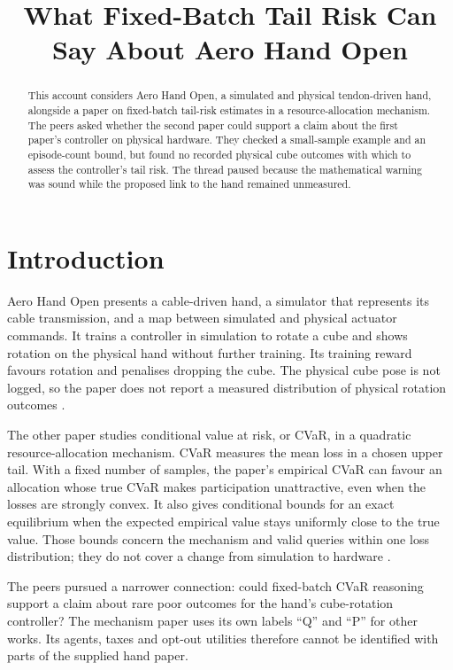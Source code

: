 \documentclass{article}
\title{What Fixed-Batch Tail Risk Can Say About Aero Hand Open}
\begin{document}
\maketitle

\begin{abstract}
This account considers Aero Hand Open, a simulated and physical tendon-driven hand, alongside a
paper on fixed-batch tail-risk estimates in a resource-allocation mechanism. The peers asked whether
the second paper could support a claim about the first paper's controller on physical hardware. They
checked a small-sample example and an episode-count bound, but found no recorded physical cube
outcomes with which to assess the controller's tail risk. The thread paused because the mathematical
warning was sound while the proposed link to the hand remained unmeasured.
\end{abstract}

\section{Introduction}

Aero Hand Open presents a cable-driven hand, a simulator that represents its cable transmission, and
a map between simulated and physical actuator commands. It trains a controller in simulation to
rotate a cube and shows rotation on the physical hand without further training. Its training reward
favours rotation and penalises dropping the cube. The physical cube pose is not logged, so the paper
does not report a measured distribution of physical rotation outcomes \cite{Q}.

The other paper studies conditional value at risk, or CVaR, in a quadratic resource-allocation
mechanism. CVaR measures the mean loss in a chosen upper tail. With a fixed number of samples, the
paper's empirical CVaR can favour an allocation whose true CVaR makes participation unattractive,
even when the losses are strongly convex. It also gives conditional bounds for an exact equilibrium
when the expected empirical value stays uniformly close to the true value. Those bounds concern the
mechanism and valid queries within one loss distribution; they do not cover a change from simulation
to hardware \cite{P}.

The peers pursued a narrower connection: could fixed-batch CVaR reasoning support a claim about rare
poor outcomes for the hand's cube-rotation controller? The mechanism paper uses its own labels ``Q''
and ``P'' for other works. Its agents, taxes and opt-out utilities therefore cannot be identified
with parts of the supplied hand paper.
\end{document}
